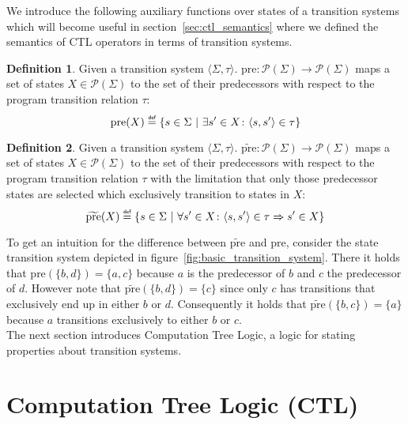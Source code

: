 \documentclass[11pt,a4paper,titlepage]{article}
\theoremstyle{definition}
\newtheorem{definition}{Definition}[section]
\newcommand\eqdef{\mathrel{\overset{\makebox[0pt]{\mbox{\normalfont\tiny\sffamily def}}}{=}}}
\begin{document}
We introduce the following auxiliary functions over states of a transition systems which will become 
useful in section~\ref{sec:ctl_semantics} where we defined the semantics of CTL operators in terms of transition systems.

\begin{definition}\label{def:pre}
    Given a transition system $\langle \Sigma, \tau \rangle$. $\text{pre} \colon \mathcal{P}(\Sigma) \to \mathcal{P}(\Sigma)$
    maps a set of states $X \in \mathcal{P}(\Sigma)$ to the set of their predecessors with respect to the program transition
    relation $\tau$:
\begin{equation}
    \text{pre}(X) \eqdef \{s \in \Sigma \ | \ \exists s' \in X \colon \langle s, s' \rangle \in \tau \}  
\end{equation}
\end{definition}


\begin{definition}\label{def:tilde_pre}
    Given a transition system $\langle \Sigma, \tau \rangle$. $\widetilde{\text{pre}} \colon \mathcal{P}(\Sigma) \to \mathcal{P}(\Sigma)$
    maps a set of states $X \in \mathcal{P}(\Sigma)$ to the set of their predecessors with respect to the program transition
    relation $\tau$ with the limitation that only those predecessor states are selected which exclusively transition to states in $X$:
\begin{equation}
    \widetilde{\text{pre}}(X) \eqdef \{s \in \Sigma \ | \ \forall s' \in X \colon \langle s, s' \rangle \in \tau \Rightarrow s' \in X \}  
\end{equation}
\end{definition}

To get an intuition for the difference between $\widetilde{\text{pre}}$ and $\text{pre}$, consider the state transition system 
depicted in figure~\ref{fig:basic_transition_system}. There it holds that $\text{pre}(\{b, d\}) = \{a, c\}$ 
because $a$ is the predecessor of $b$ and $c$ the predecessor of $d$. 
However note that $\widetilde{\text{pre}}(\{b, d\}) = \{c\}$ since only $c$ has 
transitions that exclusively end up in either $b$ or $d$. 
Consequently it holds that $\widetilde{\text{pre}}(\{b, c\}) = \{a\}$ because $a$ transitions exclusively to either $b$ or $c$.\\

The next section introduces Computation Tree Logic, 
a logic for stating properties about transition systems.  

\section{Computation Tree Logic (CTL)}\label{sec:computation_tree_logic}
\end{document}
